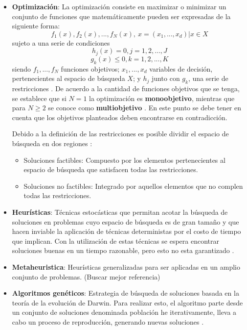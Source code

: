 \documentclass[11pt,letterpaper]{article}
\begin{document}
\begin{itemize}
\item \textbf{Optimización}: La optimización consiste en maximizar o minimizar un conjunto de funciones que matemáticamente pueden ser expresadas de la siguiente forma:
$$f_1(x),f_2(x), ..., f_N(x),\ x=(x_1,...,x_d) | x \in X$$
sujeto a una serie de condiciones
$$h_j(x) = 0, j=1,2,...,J$$
$$g_k(x) \leq 0, k=1,2,...,K$$
siendo $f_1,...,f_N$ funciones objetivos; $x_1, ..., x_d$ variables de decisión, pertenecientes al espacio de búsqueda $X$; y $h_j$ junto con $g_k$, una serie de restricciones \cite{Yang2015}. De acuerdo a la cantidad de funciones objetivos que se tenga, se establece que si $N=1$ la optimización es \textbf{monoobjetivo}, mientras que para $N\geq 2$ se conoce como \textbf{multiobjetivo} \cite{Yang2015}. En este punto se debe tener en cuenta que los objetivos planteados deben encontrarse en contradicción. 

Debido a la definición de las restricciones es posible dividir el espacio de búsqueda en dos regiones \cite{Bozorg-Haddad2017}:
\begin{itemize}
	\item Soluciones factibles: Compuesto por los elementos pertenecientes al espacio de búsqueda que satisfacen todas las restricciones.
	\item Soluciones no factibles: Integrado por aquellos elementos que no complen todas las restricciones.
\end{itemize}


\item \textbf{Heurísticas}: Técnicas estocásticas que permitan acotar la búsqueda de soluciones en problemas cuyo espacio de búsqueda es de gran tamaño y que hacen inviable la aplicación de técnicas deterministas por el costo de tiempo que implican. Con la utilización de estas técnicas se espera encontrar soluciones buenas en un tiempo razonable, pero esto no esta garantizado \cite{Yang2015,Romanycia1985}.


\item \textbf{Metaheuristica}: Heurísticas generalizadas para ser aplicadas en un amplio conjunto de problemas. (Buscar mejor referencia)

\item \textbf{Algoritmos genéticos}: Estrategia de búsqueda de soluciones basada en la teoría de la evolución de Darwin. Para realizar esto, el algoritmo  parte desde un conjunto de soluciones denominada población he iterativamente, lleva a cabo un proceso de reproducción, generando nuevas soluciones \cite{Heiss-Czedik1997}.


\end{itemize}
\end{document}
